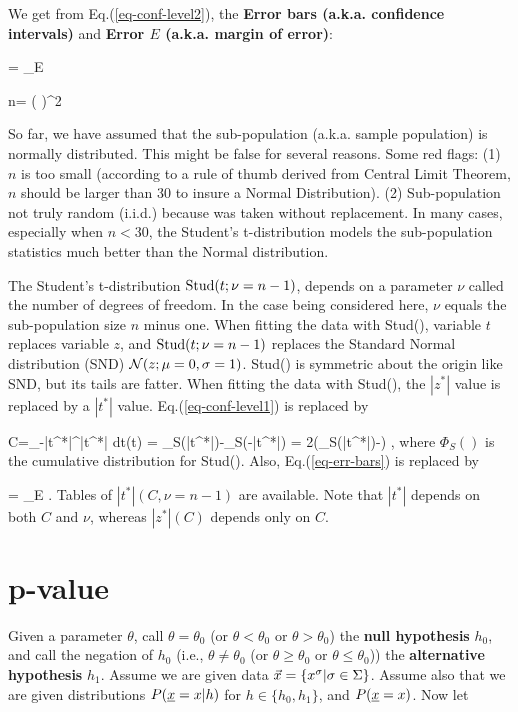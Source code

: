 We get
from Eq.(\ref{eq-conf-level2}),
the {\bf Error bars (a.k.a. confidence intervals)}
and
{\bf Error $E$ (a.k.a. margin of error)}:



\beq
{} =
 \pm
{}_{E}
\label{eq-err-bars}
\eeq

\beq
n= \left(
\right)^2
\eeq

So far, we have assumed
that the sub-population (a.k.a. sample
population)
is normally distributed.
This might be false
for several reasons.
Some red flags: (1)
$n$ is too small (according to
a rule of thumb derived from
Central Limit Theorem, $n$
should be larger than 30
to insure a Normal Distribution).
(2) Sub-population not truly random
(i.i.d.)
because was taken
without replacement.
In many cases,
especially
when $n<30$,
the Student's t-distribution
models the sub-population statistics
much
better than the Normal distribution.


The {\rm Student's t-distribution } ${\rm Stud}(t;
\nu=n-1)$,
depends
on a parameter $\nu$
called the
number of
degrees of freedom.
In the case being considered here,
$\nu$ equals the
sub-population size $n$
minus one.
When fitting
the data with
Stud(), variable
$t$ replaces
variable $z$,
and ${\rm Stud}(t; \nu=n-1)$
replaces the Standard Normal distribution (SND)
${\cal N}(z; \mu=0, \sigma=1)$.
Stud() is symmetric about
the origin like SND,
but its tails
are fatter.
When fitting the data with Stud(),
the $|z^*|$
value is replaced
by a $|t^*|$ value.
Eq.(\ref{eq-conf-level1})
is replaced by


\beq
C=\int_{-|t^*|}^{|t^*|} dt(t) =
\Phi_S(|t^*|)-\Phi_S(-|t^*|)
=
2\left(\Phi_S(|t^*|)-\;\right)
\label{eq-conf-level1-stu}
\;,
\eeq
where $\Phi_S()$
is the cumulative
distribution for  Stud().
Also, Eq.(\ref{eq-err-bars})
is replaced  by

\beq
{} =
 \pm
{}_{E}
\;.
\eeq
Tables of $|t^*|(C,\nu=n-1)$
are available. Note
that $|t^*|$
depends on both $C$ and $\nu$,
whereas $|z^*|(C)$
depends only on $C$.

\section{p-value}


Given a parameter $\theta$, call
$\theta=\theta_0$ (or  $\theta<\theta_0$ or $\theta>\theta_0$) the
{\bf null hypothesis} $h_0$,
and call the negation of $h_0$ (i.e., 
$\theta\neq\theta_0$ (or  $\theta\geq\theta_0$ or $\theta\leq \theta_0$))
the {\bf alternative hypothesis} $h_1$.
Assume we
are given data $\vec{x}=\{x^\sigma|\sigma\in \Sigma\}$. Assume
also that we are given
distributions $P({\underline{x}}=x|h)$ for $h\in \{h_0, h_1\}$,
and $P({\underline{x}}=x)$. Now let

